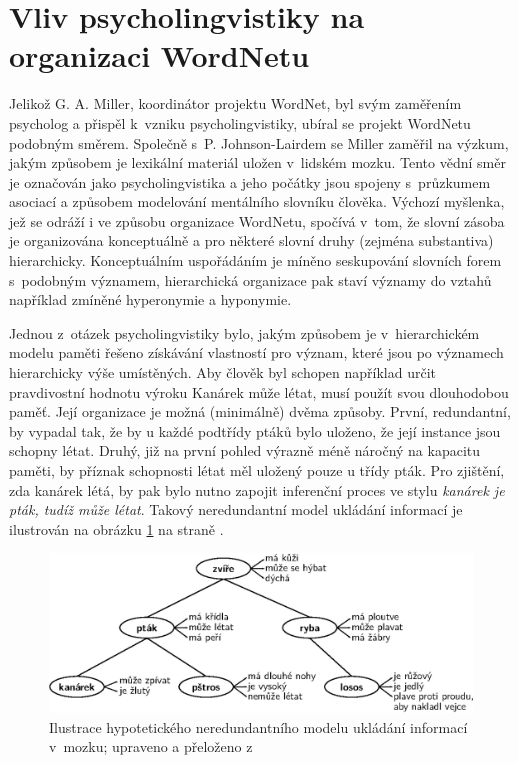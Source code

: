 \documentclass[a4paper,11pt,openany,twoside]{book}
\newcommand\ex{\textsf}
\begin{document}

			\section{Vliv psycholingvistiky na organizaci WordNetu}
			\label{cha:psycho}

				Jelikož G. A. Miller, koordinátor projektu WordNet, byl svým zaměřením psycholog a přispěl k~vzniku psycholingvistiky, ubíral se projekt WordNetu podobným směrem. Společně s~P. Johnson-Lairdem se Miller zaměřil na výzkum, jakým způsobem je lexikální materiál uložen v~lidském mozku. Tento vědní směr je označován jako psycholingvistika a jeho počátky jsou spojeny s~průzkumem asociací a způsobem modelování mentálního slovníku člověka. Výchozí myšlenka, jež se odráží i ve způsobu organizace WordNetu, spočívá v~tom, že slovní zásoba je organizována konceptuálně a pro některé slovní druhy (zejména substantiva) hierarchicky. Konceptuálním uspořádáním je míněno seskupování slovních forem s~podobným významem, hierarchická organizace pak staví významy do vztahů například zmíněné hyperonymie a hyponymie.

				Jednou z~otázek psycholingvistiky bylo, jakým způsobem je v~hierarchickém modelu paměti řešeno získávání vlastností pro význam, které jsou  po významech hierarchicky výše umístěných. Aby člověk byl schopen například určit pravdivostní hodnotu výroku \ex{Kanárek může létat}, musí použít svou dlouhodobou paměť. Její organizace je možná (minimálně) dvěma způsoby. První, redundantní, by vypadal tak, že by u každé podtřídy ptáků bylo uloženo, že její instance jsou schopny létat. Druhý, již na první pohled výrazně méně náročný na kapacitu paměti, by příznak schopnosti létat měl uložený pouze u třídy \ex{pták}. Pro zjištění, zda kanárek létá, by pak bylo nutno zapojit inferenční proces ve stylu \textit{kanárek je pták, tudíž může létat}. \parencite{collins1969retrieval} Takový neredundantní model ukládání informací je ilustrován na obrázku \ref{fig:canary-can-sing} na straně \pageref{fig:canary-can-sing}.

				\begin{figure}[h]
					\centering
					\includegraphics[width=1.0\textwidth]{canary-can-sing.eps}
					\caption{Ilustrace hypotetického neredundantního modelu ukládání informací v~mozku; upraveno a přeloženo z~\textcite{collins1969retrieval}}
					\label{fig:canary-can-sing}
				\end{figure}
\end{document}
